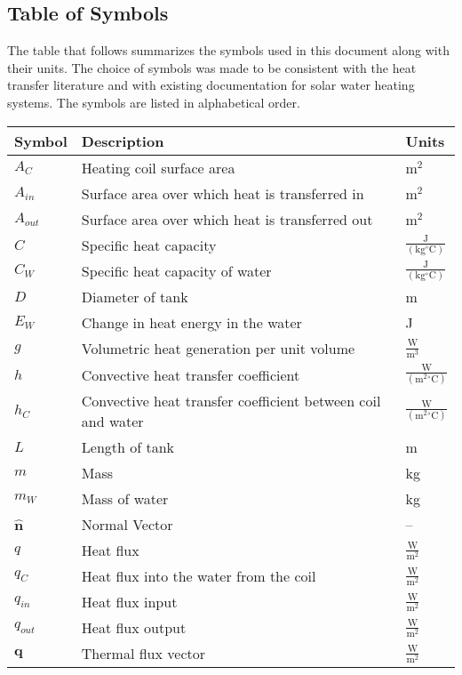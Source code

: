 \documentclass[12pt]{article}
\begin{document}
\subsection{Table of Symbols}
\label{Sec:ToS}
The table that follows summarizes the symbols used in this document along with their units. The choice of symbols was made to be consistent with the heat transfer literature and with existing documentation for solar water heating systems. The symbols are listed in alphabetical order.
\begin{longtabu}{l X[l] l}
\toprule
Symbol & Description & Units
\\
\midrule
${A_{C}}$ & Heating coil surface area & $\text{m}^{2}$
\\
${A_{in}}$ & Surface area over which heat is transferred in & $\text{m}^{2}$
\\
${A_{out}}$ & Surface area over which heat is transferred out & $\text{m}^{2}$
\\
$C$ & Specific heat capacity & $\frac{\text{J}}{(\text{kg}{}^{\circ}\text{C})}$
\\
${C_{W}}$ & Specific heat capacity of water & $\frac{\text{J}}{(\text{kg}{}^{\circ}\text{C})}$
\\
$D$ & Diameter of tank & m
\\
${E_{W}}$ & Change in heat energy in the water & J
\\
$g$ & Volumetric heat generation per unit volume & $\frac{\text{W}}{\text{m}^{3}}$
\\
$h$ & Convective heat transfer coefficient & $\frac{\text{W}}{(\text{m}^{2}{}^{\circ}\text{C})}$
\\
${h_{C}}$ & Convective heat transfer coefficient between coil and water & $\frac{\text{W}}{(\text{m}^{2}{}^{\circ}\text{C})}$
\\
$L$ & Length of tank & m
\\
$m$ & Mass & kg
\\
${m_{W}}$ & Mass of water & kg
\\
$\mathbf{\hat{n}}$ & Normal Vector & --
\\
$q$ & Heat flux & $\frac{\text{W}}{\text{m}^{2}}$
\\
${q_{C}}$ & Heat flux into the water from the coil & $\frac{\text{W}}{\text{m}^{2}}$
\\
${q_{in}}$ & Heat flux input & $\frac{\text{W}}{\text{m}^{2}}$
\\
${q_{out}}$ & Heat flux output & $\frac{\text{W}}{\text{m}^{2}}$
\\
$\mathbf{q}$ & Thermal flux vector & $\frac{\text{W}}{\text{m}^{2}}$

\end{longtabu}
\end{document}
